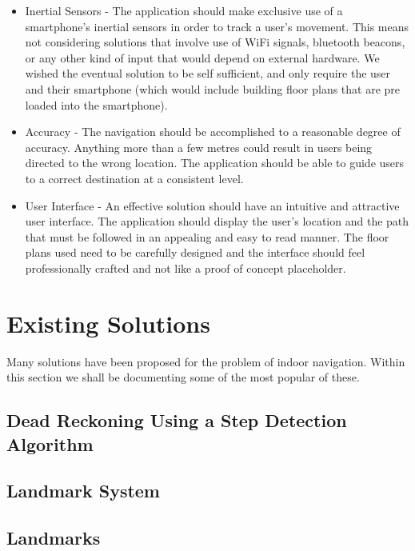\documentclass[12pt,a4paper]{report}
\begin{document}
\begin{itemize}
\item Inertial Sensors - The application should make exclusive use of a smartphone's inertial sensors in order to track a user's movement. This means not considering solutions that involve use of WiFi signals, bluetooth beacons, or any other kind of input that would depend on external hardware. We wished the eventual solution to be self sufficient, and only require the user and their smartphone (which would include building floor plans that are pre loaded into the smartphone).

\item Accuracy - The navigation should be accomplished to a reasonable degree of accuracy. Anything more than a few metres could result in users being directed to the wrong location. The application should be able to guide users to a correct destination at a consistent level.

\item User Interface - An effective solution should have an intuitive and attractive user interface. The application should display the user's location and the path that must be followed in an appealing and easy to read manner. The floor plans used need to be carefully designed and the interface should feel professionally crafted and not like a proof of concept placeholder.

\end{itemize}

\chapter{Existing Solutions}

Many solutions have been proposed for the problem of indoor navigation. Within this section we shall be documenting some of the most popular of these.

\section{Dead Reckoning Using a Step Detection Algorithm}

\section{Landmark System}

\section{Landmarks}
\end{document}
